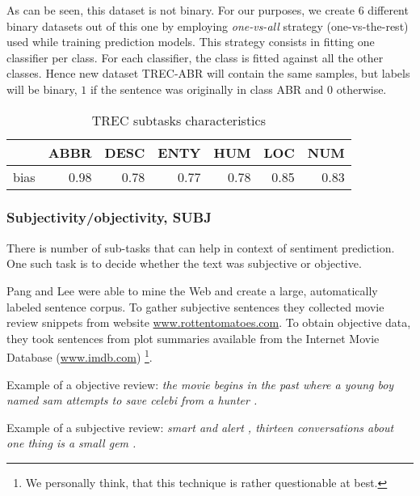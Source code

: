     As can be seen, this dataset is not binary. 
    For our purposes, we create $6$ different binary datasets out of this one by employing \emph{one-vs-all} strategy (one-vs-the-rest) used while training prediction models.
    This strategy consists in fitting one classifier per class. 
    For each classifier, the class is fitted against all the other classes. 
    Hence new dataset TREC-ABR will contain the same samples, but labels will be binary, $1$ if the sentence was originally in class ABR and $0$ otherwise.
    
\begin{table}[h]
\begin{center}

\begin{tabular}{lrrrrrr}
\toprule
{} &  ABBR &  DESC &  ENTY &   HUM &   LOC &   NUM \\
\midrule
bias &  0.98 &  0.78 &  0.77 &  0.78 &  0.85 &  0.83 \\
\bottomrule
\end{tabular}

\caption[TREC subtasks characteristics]{TREC subtasks characteristics}
\label{tab:trec:stats}
\end{center}
\end{table}

    \subsubsection{Subjectivity/objectivity, SUBJ}
    
    There is number of sub-tasks that can help in context of sentiment prediction.
    One such task is to decide whether the text was subjective or objective.
        
    Pang and Lee were able to mine the Web and create a large, automatically labeled sentence corpus. 
    To gather subjective sentences they collected movie review snippets from website  \url{www.rottentomatoes.com}.
    To obtain objective data, they took sentences from plot summaries available from the Internet Movie Database (\url{www.imdb.com}) \cite{pang2004sentimental} \footnote{We personally think, that this technique is rather questionable at best.}.
    
    Example of a objective review:
    \emph{the movie begins in the past where a young boy named sam attempts to save celebi from a hunter .}

    Example of a subjective review:
    \emph{smart and alert , thirteen conversations about one thing is a small gem .}
    


